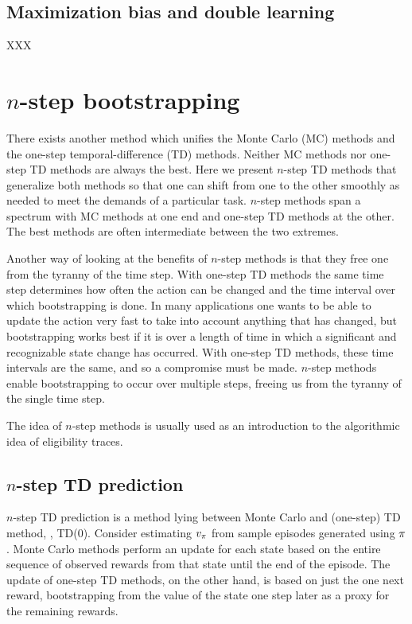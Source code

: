 \subsection{Maximization bias and double learning}

XXX

\section{$n$-step bootstrapping}
\label{sec:n-step}

There exists another method which unifies
the Monte Carlo (MC) methods and the one-step temporal-difference (TD) methods.
Neither MC methods nor one-step TD methods are always the best.
Here we present $n$-step TD methods that generalize both methods
so that one can shift from one to the other smoothly as needed to meet the demands of a particular task.
$n$-step methods span a spectrum with MC methods at one end and one-step TD methods at the other.
The best methods are often intermediate between the two extremes.

Another way of looking at the benefits of $n$-step methods is
that they free one from the tyranny of the time step.
With one-step TD methods the same time step determines how often the action can be changed
and the time interval over which bootstrapping is done.
In many applications one wants to be able to update the action very fast
to take into account anything that has changed,
but bootstrapping works best if it is over a length of time in which a significant and recognizable state change has occurred.
With one-step TD methods,
these time intervals are the same,
and so a compromise must be made.
$n$-step methods enable bootstrapping to occur over multiple steps,
freeing us from the tyranny of the single time step.

The idea of $n$-step methods is usually used as an introduction to the algorithmic idea of eligibility traces.

\subsection{$n$-step TD prediction}

$n$-step TD prediction is a method lying between Monte Carlo and (one-step) TD method, \ie, TD(0).
Consider estimating $v_{\pi}$ from sample episodes generated using $\pi$.
Monte Carlo methods perform an update for each state based on the entire sequence of observed rewards
from that state until the end of the episode.
The update of one-step TD methods, on the other hand,
is based on just the one next reward,
bootstrapping from the value of the state one step later as a proxy for the remaining rewards.

